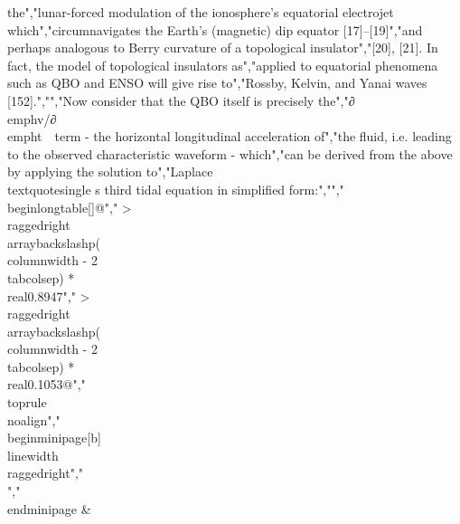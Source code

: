 {{{{{{{the","lunar-forced modulation of the ionosphere's equatorial electrojet which","circumnavigates the Earth's (magnetic) dip equator {[}17{]}--{[}19{]}","and perhaps analogous to Berry curvature of a topological insulator","{[}20{]}, {[}21{]}. In fact, the model of topological insulators as","applied to equatorial phenomena such as QBO and ENSO will give rise to","Rossby, Kelvin, and Yanai waves {[}152{]}.","","Now consider that the QBO itself is precisely the","∂\\emph{v/}∂\\emph{t}~~term - the horizontal longitudinal acceleration of","the fluid, i.e. leading to the observed characteristic waveform - which","can be derived from the above by applying the solution to","Laplace\\textquotesingle s third tidal equation in simplified form:","","\\begin{longtable}[]{@{}","  >{\\raggedright\\arraybackslash}p{(\\columnwidth - 2\\tabcolsep) * \\real{0.8947}}","  >{\\raggedright\\arraybackslash}p{(\\columnwidth - 2\\tabcolsep) * \\real{0.1053}}@{}}","\\toprule\\noalign{}","\\begin{minipage}[b]{\\linewidth}\\raggedright","\\[\\frac{\\partial v}{\\partial t} = \\cos(\\sqrt{A}\\sum_{i = 1}^{i = N}{k_{i}\\sin(\\omega_{i}t)} + \\theta_{0})\\]","\\end{minipage} & }}}}}}}

